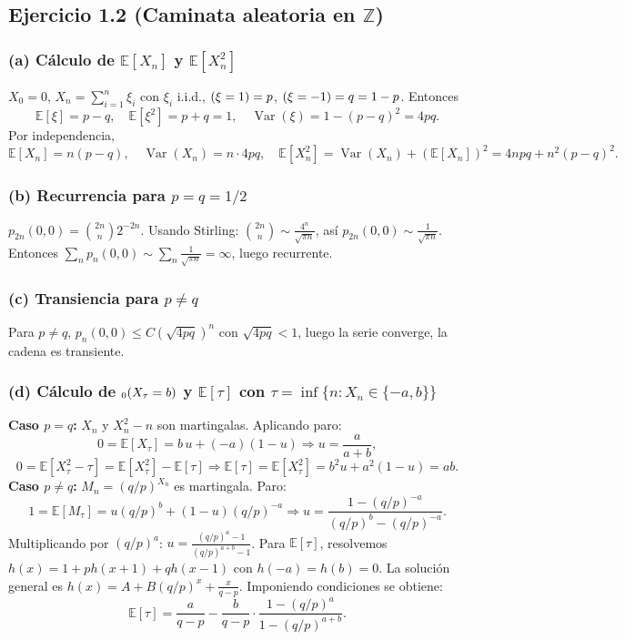 \documentclass[12pt]{article}
\let\P\relax
\newcommand{\P}{\mathbb{P}}
\newcommand{\E}{\mathbb{E}}
\newcommand{\Z}{\mathbb{Z}}
\newcommand{\1}{\mathbf{1}}
\newcommand{\Var}{\operatorname{Var}}
\begin{document}
\subsection{Ejercicio 1.2 (Caminata aleatoria en $\Z$)}

\subsubsection*{(a) C\'alculo de $\E[X_n]$ y $\E[X_n^2]$}
$X_0=0$, $X_n=\sum_{i=1}^n\xi_i$ con $\xi_i$ i.i.d., $\P(\xi=1)=p$, $\P(\xi=-1)=q=1-p$. Entonces
\[
\E[\xi]=p-q,\quad \E[\xi^2]=p+q=1,\quad \Var(\xi)=1-(p-q)^2=4pq.
\]
Por independencia,
\[
\E[X_n]=n(p-q),\quad \Var(X_n)=n\cdot4pq,\quad \E[X_n^2]=\Var(X_n)+(\E[X_n])^2=4npq+n^2(p-q)^2.
\]

\subsubsection*{(b) Recurrencia para $p=q=1/2$}
$p_{2n}(0,0)=\binom{2n}{n}2^{-2n}$. Usando Stirling: $\binom{2n}{n}\sim\frac{4^n}{\sqrt{\pi n}}$, as\'i $p_{2n}(0,0)\sim\frac1{\sqrt{\pi n}}$. Entonces $\sum_n p_n(0,0)\sim\sum_n\frac1{\sqrt{\pi n}}=\infty$, luego recurrente.

\subsubsection*{(c) Transiencia para $p\neq q$}
Para $p\neq q$, $p_n(0,0)\le C(\sqrt{4pq})^n$ con $\sqrt{4pq}<1$, luego la serie converge, la cadena es transiente.

\subsubsection*{(d) C\'alculo de $\P_0(X_\tau=b)$ y $\E[\tau]$ con $\tau=\inf\{n:X_n\in\{-a,b\}\}$}
\textbf{Caso $p=q$:} $X_n$ y $X_n^2-n$ son martingalas. Aplicando paro:
\[
0=\E[X_\tau]=b\,u+(-a)(1-u)\Rightarrow u=\frac{a}{a+b},
\]
\[
0=\E[X_\tau^2-\tau]=\E[X_\tau^2]-\E[\tau]\Rightarrow \E[\tau]=\E[X_\tau^2]=b^2u+a^2(1-u)=ab.
\]
\textbf{Caso $p\neq q$:} $M_n=(q/p)^{X_n}$ es martingala. Paro:
\[
1=\E[M_\tau]=u(q/p)^b+(1-u)(q/p)^{-a}\Rightarrow u=\frac{1-(q/p)^{-a}}{(q/p)^b-(q/p)^{-a}}.
\]
Multiplicando por $(q/p)^a$: $u=\frac{(q/p)^a-1}{(q/p)^{a+b}-1}$. Para $\E[\tau]$, resolvemos $h(x)=1+ph(x+1)+qh(x-1)$ con $h(-a)=h(b)=0$. La soluci\'on general es $h(x)=A+B(q/p)^x+\frac{x}{q-p}$. Imponiendo condiciones se obtiene:
\[
\E[\tau]=\frac{a}{q-p}-\frac{b}{q-p}\cdot\frac{1-(q/p)^a}{1-(q/p)^{a+b}}.
\]
\end{document}
